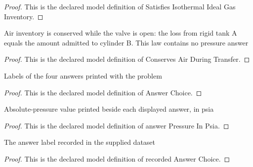 \begin{proof}
  This is the declared model definition of Satisfies Isothermal Ideal Gas Inventory.
\end{proof}
\begin{definition}
  \label{def:physics:phyx-mini-0448:phyxminiproblems-problemphyxmini0448-conservesairduringtransfer}
  Air inventory is conserved while the valve is open: the loss from rigid tank A equals the amount admitted to cylinder B. This law contains no pressure answer
\end{definition}
\begin{proof}
  This is the declared model definition of Conserves Air During Transfer.
\end{proof}
\begin{definition}
  \label{def:physics:phyx-mini-0448:phyxminiproblems-problemphyxmini0448-answerchoice}
  Labels of the four answers printed with the problem
\end{definition}
\begin{proof}
  This is the declared model definition of Answer Choice.
\end{proof}
\begin{definition}
  \label{def:physics:phyx-mini-0448:phyxminiproblems-problemphyxmini0448-answerpressureinpsia}
  Absolute-pressure value printed beside each displayed answer, in psia
\end{definition}
\begin{proof}
  This is the declared model definition of answer Pressure In Psia.
\end{proof}
\begin{definition}
  \label{def:physics:phyx-mini-0448:phyxminiproblems-problemphyxmini0448-recordedanswerchoice}
  The answer label recorded in the supplied dataset
\end{definition}
\begin{proof}
  This is the declared model definition of recorded Answer Choice.
\end{proof}
